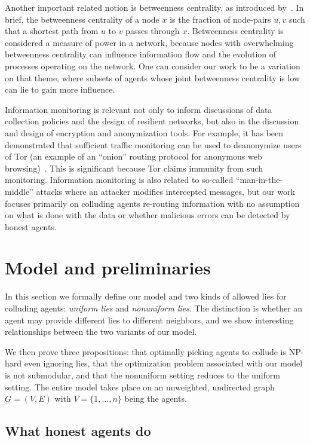\documentclass[prodmode,acmec]{ec-acmsmall}
\begin{document}
Another important related notion is betweenness centrality, as introduced
by~\cite{Freeman77}. In brief, the betweenness centrality of a node $x$ is the
fraction of node-pairs $u,v$ such that a shortest path from $u$ to $v$ passes
through $x$. Betweenness centrality is considered a measure of power in a
network, because nodes with overwhelming betweenness centrality can influence
information flow and the evolution of processes operating on the network. One
can consider our work to be a variation on that theme, where subsets of agents
whose joint betweenness centrality is low can lie to gain more influence.

Information monitoring is relevant not only to inform discussions of data
collection policies and the design of resilient networks, but also in the
discussion and design of encryption and anonymization tools. For example, it
has been demonstrated that sufficient traffic monitoring can be used to
deanonymize users of Tor (an example of an ``onion'' routing protocol for
anonymous web browsing)~\cite{AkhoondiYM12}. This is significant because Tor
claims immunity from such monitoring. Information monitoring is also related to
so-called ``man-in-the-middle'' attacks where an attacker modifies intercepted
messages, but our work focuses primarily on colluding agents re-routing
information with no assumption on what is done with the data or whether
malicious errors can be detected by honest agents.

\section{Model and preliminaries} \label{sec:models}

In this section we formally define our model and two kinds of allowed lies for
colluding agents: \emph{uniform lies} and \emph{nonuniform lies}. The
distinction is whether an agent may provide different lies to different
neighbors, and we show interesting relationships between the two variants of
our model. 

We then prove three propositions: that optimally picking agents to collude is
NP-hard even ignoring lies, that the optimization problem associated with our
model is not submodular, and that the nonuniform setting reduces to the uniform
setting. The entire model takes place on an unweighted, undirected graph $G =
(V,E)$ with $V = \{1, \dots, n\}$ being the agents.

\subsection{What honest agents do} \label{sec:synchronization}
\end{document}
